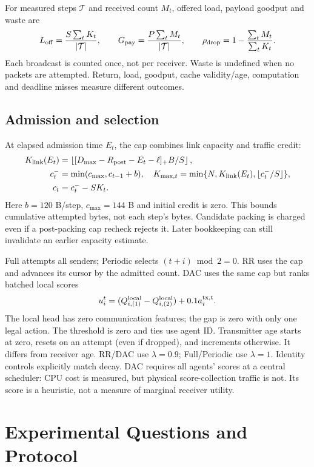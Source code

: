 \documentclass[10pt]{article}
\begin{document}
For measured steps $\mathcal T$ and received count $M_t$, offered load, payload goodput and waste are
\begin{equation}
 L_{\rm off}=\frac{S\sum_tK_t}{|\mathcal T|},\qquad G_{\rm pay}=\frac{P\sum_tM_t}{|\mathcal T|},\qquad
 \rho_{\rm drop}=1-\frac{\sum_tM_t}{\sum_tK_t}.
\end{equation}
Each broadcast is counted once, not per receiver. Waste is undefined when no packets are attempted. Return, load, goodput, cache validity/age, computation and deadline misses measure different outcomes.

\subsection{Admission and selection}
At elapsed admission time $E_t$, the cap combines link capacity and traffic credit:
\begin{align}
 K_{\rm link}(E_t)&=\left\lfloor [D_{\max}-R_{\rm post}-E_t-\ell]_+B/S\right\rfloor,\label{eq:cap}\\
 c_t^-&=\min(c_{\max},c_{t-1}+b),\quad K_{\max,t}=\min\{N,K_{\rm link}(E_t),\lfloor c_t^-/S\rfloor\},\\
 c_t&=c_t^- - SK_t.
\end{align}
Here $b=120$ B/step, $c_{\max}=144$ B and initial credit is zero. This bounds cumulative attempted bytes, not each step's bytes. Candidate packing is charged even if a post-packing cap recheck rejects it. Later bookkeeping can still invalidate an earlier capacity estimate.

Full attempts all senders; Periodic selects $(t+i)\bmod2=0$. RR uses the cap and advances its cursor by the admitted count. DAC uses the same cap but ranks batched local scores
\begin{equation}
 u_i^t=(Q_{i,(1)}^{\rm local}-Q_{i,(2)}^{\rm local})+0.1a_i^{\rm tx,t}.
\end{equation}
The local head has zero communication features; the gap is zero with only one legal action. The threshold is zero and ties use agent ID. Transmitter age starts at zero, resets on an attempt (even if dropped), and increments otherwise. It differs from receiver age. RR/DAC use $\lambda=0.9$; Full/Periodic use $\lambda=1$. Identity controls explicitly match decay. DAC requires all agents' scores at a central scheduler: CPU cost is measured, but physical score-collection traffic is not. Its score is a heuristic, not a measure of marginal receiver utility.

\section{Experimental Questions and Protocol}
\end{document}
